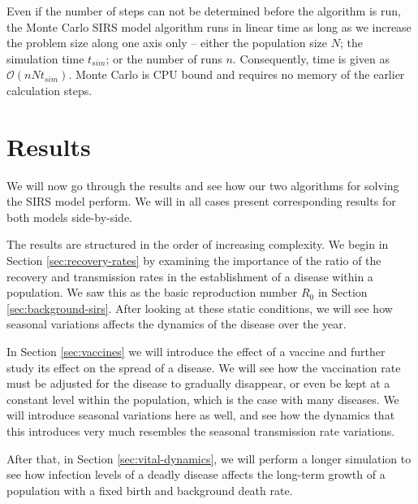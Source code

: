 \documentclass[]{article}
\begin{document}
Even if the number of steps can not be determined before the algorithm is run, the Monte Carlo SIRS model algorithm runs in linear time as long as we increase the problem size along one axis only -- either the population size $N$; the simulation time $t_{sim}$; or the number of runs $n$. Consequently, time is given as $\mathcal{O}(nNt_{sim})$. Monte Carlo is CPU bound and requires no memory of the earlier calculation steps.


\section{Results} \label{sec:results}

We will now go through the results and see how our two algorithms for solving the SIRS model perform. We will in all cases present corresponding results for both models side-by-side. 

The results are structured in the order of increasing complexity. We begin in Section \ref{sec:recovery-rates} by examining the importance of the ratio of the recovery and transmission rates in the establishment of a disease within a population. We saw this as the basic reproduction number $R_0$ in Section \ref{sec:background-sirs}. After looking at these static conditions, we will see how seasonal variations affects the dynamics of the disease over the year.

In Section \ref{sec:vaccines} we will introduce the effect of a vaccine and further study its effect on the spread of a disease. We will see how the vaccination rate must be adjusted for the disease to gradually disappear, or even be kept at a constant level within the population, which is the case with many diseases. We will introduce seasonal variations here as well, and see how the dynamics that this introduces very much resembles the seasonal transmission rate variations.

After that, in Section \ref{sec:vital-dynamics}, we will perform a longer simulation to see how infection levels of a deadly disease affects the long-term growth of a population with a fixed birth and background death rate.
\end{document}
